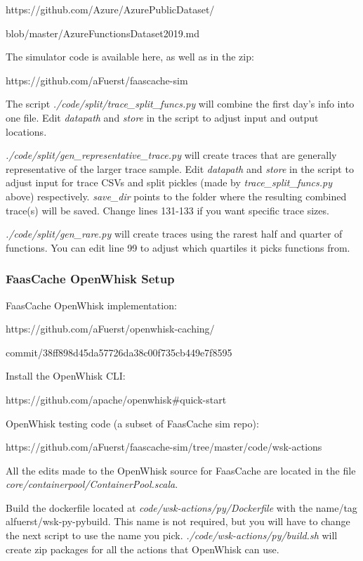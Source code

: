 https://github.com/Azure/AzurePublicDataset/

blob/master/AzureFunctionsDataset2019.md

\noindent The simulator code is available here, as well as in the zip: 

\noindent https://github.com/aFuerst/faascache-sim

The script {\em ./code/split/trace\_split\_funcs.py} will combine the first day's info into one file.
Edit {\em datapath} and {\em store} in the script to adjust input and output locations.


{\em ./code/split/gen\_representative\_trace.py} will create traces that are generally representative of the larger trace sample.
Edit {\em datapath} and {\em store} in the script to adjust input for trace CSVs and split pickles (made by {\em trace\_split\_funcs.py} above) respectively.
{\em save\_dir} points to the folder where the resulting combined trace(s) will be saved.
Change lines 131-133 if you want specific trace sizes.

{\em ./code/split/gen\_rare.py} will create traces using the rarest half and quarter of functions.
You can edit line 99 to adjust which quartiles it picks functions from.
	

\subsubsection{FaasCache OpenWhisk Setup}

FaasCache OpenWhisk implementation:

https://github.com/aFuerst/openwhisk-caching/

commit/38ff898d45da57726da38c00f735cb449e7f8595

\noindent Install the OpenWhisk CLI: 

https://github.com/apache/openwhisk\#quick-start

\noindent OpenWhisk testing code (a subset of FaasCache sim repo): 

https://github.com/aFuerst/faascache-sim/tree/master/code/wsk-actions


All the edits made to the OpenWhisk source for FaasCache are located in the file {\em core/containerpool/ContainerPool.scala}.

Build the dockerfile located at {\em code/wsk-actions/py/Dockerfile} with the name/tag alfuerst/wsk-py-pybuild.
This name is not required, but you will have to change the next script to use the name you pick.
{\em ./code/wsk-actions/py/build.sh} will create zip packages for all the actions that OpenWhisk can use.

